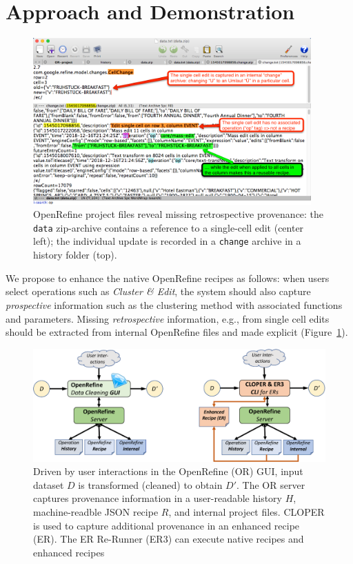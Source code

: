 \documentclass[runningheads]{llncs}
\begin{document}
\section{Approach and Demonstration}\label{sec:appr-prot-demonstr}

\begin{figure}[t] 
\centering
\includegraphics[width=0.95\textwidth]{figs/OR-internal.png}
\caption{OpenRefine project files reveal missing retrospective provenance: the \texttt{data} zip-archive contains a reference to a single-cell edit (center left); the individual update is recorded in a \texttt{change} archive in a history folder (top). } \label{fig-archives}
\end{figure}
 
We propose to enhance the native OpenRefine recipes as follows: when users select operations such as
\emph{Cluster \& Edit}, the system should also capture \emph{prospective} information such as the
clustering method with associated functions and parameters. Missing \emph{retrospective}
information, e.g., from single cell edits should be extracted from internal OpenRefine files and
made explicit (Figure~\ref{fig-archives}).

\begin{figure}[h]
        \centering
        \includegraphics[width=\textwidth]{figs/reproducible-OR-crop} 
        \caption{Driven by user interactions in the OpenRefine (OR) GUI, input dataset $D$ is transformed
          (cleaned)  to obtain $D'$. The OR server captures provenance information in a
          user-readable history $H$, machine-readble JSON recipe $R$, and internal project files.
          CLOPER is used to capture additional provenance in an enhanced recipe (ER). The ER
          Re-Runner (ER3) can execute native recipes and enhanced recipes}\label{fig-CLOPER-ER3}
\end{figure}
 
\end{document}
